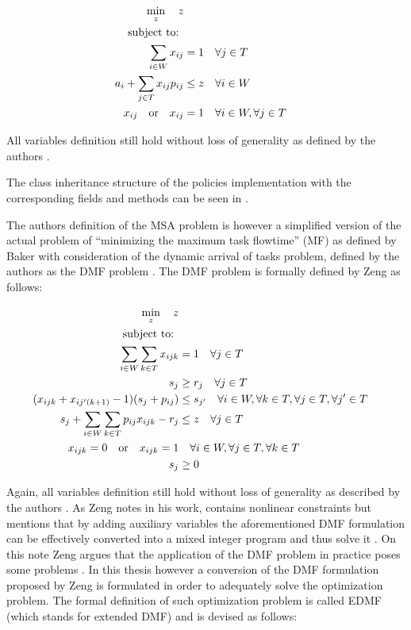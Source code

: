 \documentclass{seal_thesis}
\begin{document}
\begin{align}
    \min_z \quad z\\
    \text{subject to: } \notag \\
    \sum_{i \in W} x_{ij} &= 1 \quad \forall j \in T\\
    a_i + \sum_{j \in T} x_{ij} p_{ij} &\leq z \quad \forall i \in W\\
    x_{ij} \quad \text{or} \quad x_{ij}&=1 \quad \forall i \in W, \forall j \in T
\end{align}

All variables definition still hold without loss of generality as defined by the authors \cite[pp. 5-7]{Zeng2005}.

The class inheritance structure of the policies implementation with the corresponding fields and methods can be seen in .


The authors definition of the MSA problem is however a simplified version of the actual problem of ``minimizing the maximum task flowtime'' (MF) as defined by Baker \cite{Baker1974} with consideration of the dynamic arrival of tasks problem, defined by the authors as the DMF problem \cite{Zeng2005}. The DMF problem is formally defined by Zeng as follows:

\begin{align}
    \min_z \quad z\\
    \text{subject to: } \notag \\
    \sum_{i \in W} \sum_{k \in T} x_{ijk} &= 1 \quad \forall j \in T\\
    s_j &\geq r_j \quad \forall j \in T\\
    (x_{ijk} + x_{ij'(k+1)} - 1)(s_j + p_{ij}) &\leq s_{j'} \quad \forall i \in W, \forall k \in T, \forall j \in T, \forall j' \in T \label{eq:nonlinear_constraints_dmf}\\
    s_j + \sum_{i \in W} \sum_{k \in T} p_{ij} x_{ijk} - r_j &\leq z \quad \forall j \in T\\
    x_{ijk} = 0 \quad \text{or} \quad x_{ijk} = 1 &\quad \forall i \in W, \forall j \in T, \forall k \in T\\
    s_j &\geq 0
\end{align}

Again, all variables definition still hold without loss of generality as described by the authors \cite[p. 6]{Zeng2005}. As Zeng notes in his work,  contains nonlinear constraints but mentions that by adding auxiliary variables the aforementioned DMF formulation can be effectively converted into a mixed integer program and thus solve it \cite[p. 6]{Zeng2005}. On this note Zeng argues that the application of the DMF problem in practice poses some problems \cite{Zeng2005}. In this thesis however a conversion of the DMF formulation proposed by Zeng is formulated in order to adequately solve the optimization problem. The formal definition of such optimization problem is called EDMF (which stands for extended DMF) and is devised as follows:
\end{document}
